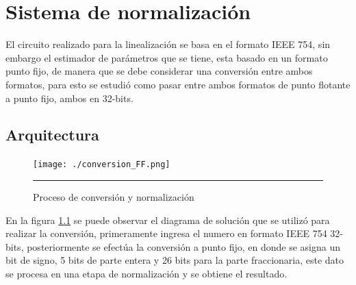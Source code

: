 \chapter{Sistema de normalización}
\label{ch:Normalizacion}

El circuito realizado para la linealización se basa en el formato IEEE 754, sin embargo el estimador de parámetros que se tiene, esta basado en un formato punto fijo, de manera que se debe considerar una conversión entre ambos formatos, para esto se estudió como pasar entre ambos formatos de punto flotante a punto fijo, ambos en 32-bits.


\section{Arquitectura}
\begin{figure}[H]
  \centering
    \texttt{[image: ./conversion\_FF.png]}
    \rule{35em}{0.5pt}
  \caption[conversión y normalización]{Proceso de conversión y normalización  }
  \label{fig:FF}
\end{figure}



  En la figura \ref{fig:FF} se puede observar el diagrama de solución que se utilizó para realizar la conversión, primeramente ingresa el numero en formato IEEE 754 32-bits, posteriormente se efectúa la conversión a punto fijo, en donde se asigna un bit de signo, 5 bits de parte entera y 26 bits para la parte fraccionaria, este dato se procesa en una etapa de normalización y se obtiene el resultado.
  
